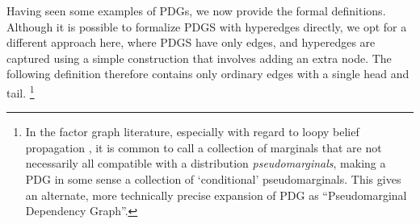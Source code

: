 \documentclass{article}
\newcommand{\vfullfootnote}[1]{}
\renewcommand{\vfullfootnote}[1]{\footnote{#1}}
\newcommand{\MN}{PDG}
\newcommand{\MNs}{\MN s}
\numberwithin{equation}{section}
\begin{document}
	Having seen some examples of \MNs, we now provide the formal
        definitions.
	Although it is possible to formalize PDGS with hyperedges directly,
        we opt for a different approach here, where PDGS have only
        edges, and hyperedges are captured using a simple construction
        that involves adding an extra node.
        	The following definition therefore contains only ordinary
        edges with a single head and tail.%
	\vfullfootnote{In the factor graph literature,
                  especially with regard to loopy belief propagation
                  \parencite{wainwright2007graphical}, it is common to
                  call a collection of marginals that are not
                  necessarily all compatible with a distribution
                  \emph{pseudomarginals}, making a PDG in some sense a
                  collection of `conditional' pseudomarginals. This
                  gives an alternate, more technically precise
                  expansion of PDG as ``Pseudomarginal Dependency
                  Graph''.} 
\end{document}
